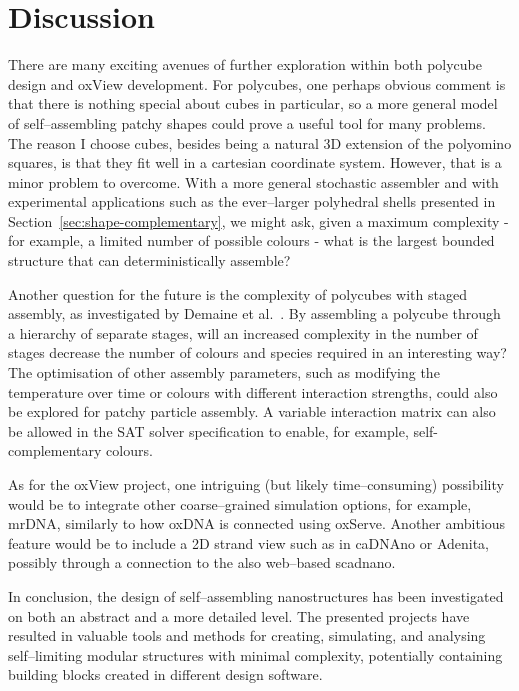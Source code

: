 \chapter{Discussion}
\label{ch:conclusion}

There are many exciting avenues of further exploration within both polycube design and oxView development. For polycubes, one perhaps obvious comment is that there is nothing special about cubes in particular, so a more general model of self--assembling patchy shapes could prove a useful tool for many problems. The reason I choose cubes, besides being a natural 3D extension of the polyomino squares, is that they fit well in a cartesian coordinate system. However, that is a minor problem to overcome. With a more general stochastic assembler and with experimental applications such as the ever--larger polyhedral shells presented in Section~\ref{sec:shape-complementary}, we might ask, given a maximum complexity - for example, a limited number of possible colours - what is the largest bounded structure that can deterministically assemble?

Another question for the future is the complexity of polycubes with staged assembly, as investigated by Demaine et al.\ \cite{demaine2008staged}. By assembling a polycube through a hierarchy of separate stages, will an increased complexity in the number of stages decrease the number of colours and species required in an interesting way? The optimisation of other assembly parameters, such as modifying the temperature over time or colours with different interaction strengths, could also be explored for patchy particle assembly. A variable interaction matrix can also be allowed in the SAT solver specification to enable, for example, self-complementary colours.

As for the oxView project, one intriguing (but likely time--consuming) possibility would be to integrate other coarse--grained simulation options, for example, mrDNA, similarly to how oxDNA is connected using oxServe. Another ambitious feature would be to include a 2D strand view such as in caDNAno or Adenita, possibly through a connection to the also web--based scadnano.

In conclusion, the design of self--assembling nanostructures has been investigated on both an abstract and a more detailed level. The presented projects have resulted in valuable tools and methods for creating, simulating, and analysing self--limiting modular structures with minimal complexity, potentially containing building blocks created in different design software.